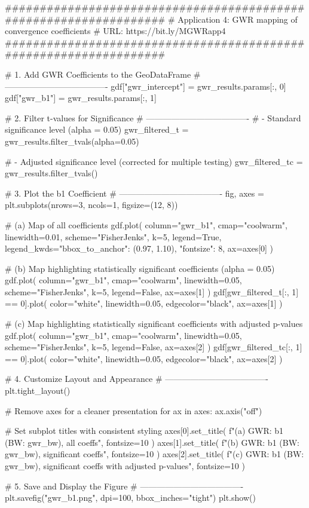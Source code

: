 \documentclass[smallextended, natbib]{svjour3}       %
\begin{document}
\begin{python}
##################################################################
# Application 4: GWR mapping of convergence coefficients
# URL: https://bit.ly/MGWRapp4
##################################################################

# 1. Add GWR Coefficients to the GeoDataFrame
# -------------------------------------
gdf["gwr_intercept"] = gwr_results.params[:, 0]
gdf["gwr_b1"] = gwr_results.params[:, 1]

# 2. Filter t-values for Significance
# -------------------------------------
# - Standard significance level (alpha = 0.05)
gwr_filtered_t = gwr_results.filter_tvals(alpha=0.05)

# - Adjusted significance level (corrected for multiple testing)
gwr_filtered_tc = gwr_results.filter_tvals()

# 3. Plot the b1 Coefficient
# -------------------------------------
fig, axes = plt.subplots(nrows=3, ncols=1, figsize=(12, 8))

# (a) Map of all coefficients
gdf.plot(
    column="gwr_b1",
    cmap="coolwarm",
    linewidth=0.01,
    scheme="FisherJenks",
    k=5,
    legend=True,
    legend_kwds={"bbox_to_anchor": (0.97, 1.10), "fontsize": 8},
    ax=axes[0]
)

# (b) Map highlighting statistically significant coefficients (alpha = 0.05)
gdf.plot(
    column="gwr_b1",
    cmap="coolwarm",
    linewidth=0.05,
    scheme="FisherJenks",
    k=5,
    legend=False,
    ax=axes[1]
)
gdf[gwr_filtered_t[:, 1] == 0].plot(
    color="white",
    linewidth=0.05,
    edgecolor="black",
    ax=axes[1]
)

# (c) Map highlighting statistically significant coefficients with adjusted p-values
gdf.plot(
    column="gwr_b1",
    cmap="coolwarm",
    linewidth=0.05,
    scheme="FisherJenks",
    k=5,
    legend=False,
    ax=axes[2]
)
gdf[gwr_filtered_tc[:, 1] == 0].plot(
    color="white",
    linewidth=0.05,
    edgecolor="black",
    ax=axes[2]
)

# 4. Customize Layout and Appearance
# -------------------------------------
plt.tight_layout()

# Remove axes for a cleaner presentation
for ax in axes:
    ax.axis("off")

# Set subplot titles with consistent styling
axes[0].set_title(
    f"(a) GWR: b1 (BW: {gwr_bw}), all coeffs", fontsize=10
)
axes[1].set_title(
    f"(b) GWR: b1 (BW: {gwr_bw}), significant coeffs", fontsize=10
)
axes[2].set_title(
    f"(c) GWR: b1 (BW: {gwr_bw}), significant coeffs with adjusted p-values",
    fontsize=10
)

# 5. Save and Display the Figure
# -------------------------------------
plt.savefig("gwr_b1.png", dpi=100, bbox_inches="tight")
plt.show()
\end{python}
\end{document}
